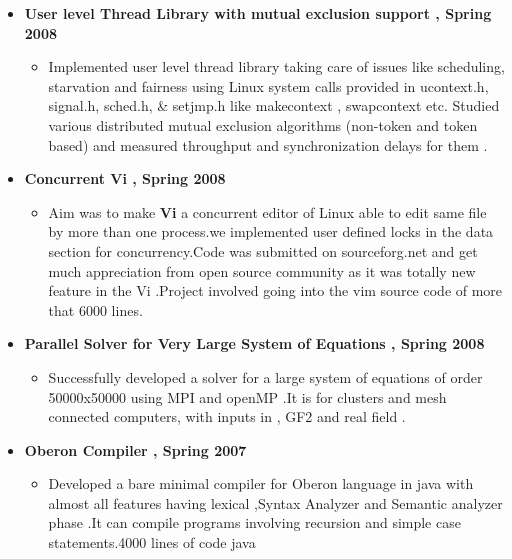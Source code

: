 \documentclass[margin]{res}
\makeatletter
\newcommand{\resitem}[1]{\item #1 \vspace{-2pt}}
\newcommand{\ressubheading}[4]{
\begin{tabular*}{6.5in}{l@{\extracolsep{\fill}}r}
		\textbf{#1} & #2 \\
		\textit{#3} & \textit{#4} \\
\end{tabular*}\vspace{-6pt}}
\makeatother
\begin{document}
\begin{itemize}
\vspace{-0.1in}
			\item \textbf{User level Thread Library with mutual exclusion support , Spring 2008}	
		\vspace{-0.1in}	
		\begin{itemize}
		\resitem{
		Implemented user level thread library taking care of issues like scheduling, starvation and fairness using  Linux system calls provided in ucontext.h, signal.h, sched.h, \& setjmp.h like makecontext , swapcontext etc.
Studied various distributed mutual exclusion algorithms (non-token and token based) and measured throughput
and synchronization delays for  them .
		 }
		\end{itemize}	
		\vspace{-0.1in}
			\item \textbf{Concurrent Vi , Spring 2008}	
		\vspace{-0.1in}	
		\begin{itemize}
		\resitem{Aim was to make \textbf{Vi} a concurrent editor of Linux able to edit same file by more than one process.we implemented user defined locks in the data section for concurrency.Code was submitted on sourceforg.net and get much appreciation from open source community as it was totally new feature in the Vi  .Project involved going into the vim source code of more that 6000 lines. }
		\end{itemize}	
\vspace{-0.1in}		
			\item \textbf{Parallel Solver for Very Large System of Equations , Spring 2008}
		\vspace{-0.1in}
		\begin{itemize}
		\resitem{ Successfully developed a solver for a large system of equations of order 50000x50000 using MPI and openMP .It is for clusters and mesh connected computers, with inputs in , GF2  and  real field . }
		
		\end{itemize}			
	\vspace{-0.1in}
	\item \textbf{Oberon Compiler , Spring 2007}
		\vspace{-0.1in}
		\begin{itemize}
		\resitem{ Developed a bare minimal compiler for Oberon language in java with almost all  features having  lexical ,Syntax Analyzer and  Semantic analyzer phase .It can compile programs involving recursion and simple case statements.4000 lines of code java}
		\end{itemize}		
		

\end{itemize}
\end{document}
